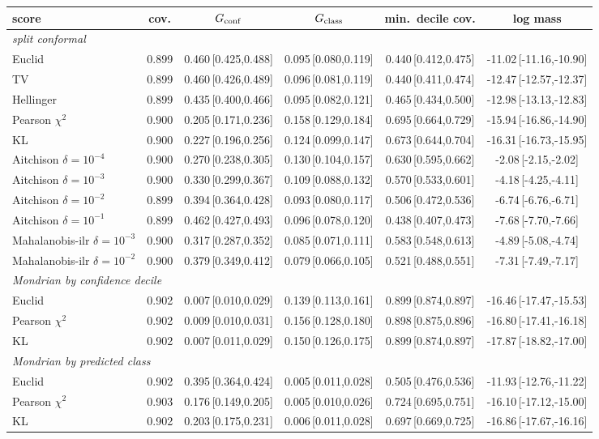 \begin{tabular}{lccccc}\toprule
score & cov. & $G_{\rm conf}$ & $G_{\rm class}$ & min.\ decile cov. & log mass\\\midrule
\multicolumn{6}{l}{\emph{split conformal}}\\
Euclid & 0.899 & 0.460\,[0.425,0.488] & 0.095\,[0.080,0.119] & 0.440\,[0.412,0.475] & -11.02\,[-11.16,-10.90]\\
TV & 0.899 & 0.460\,[0.426,0.489] & 0.096\,[0.081,0.119] & 0.440\,[0.411,0.474] & -12.47\,[-12.57,-12.37]\\
Hellinger & 0.899 & 0.435\,[0.400,0.466] & 0.095\,[0.082,0.121] & 0.465\,[0.434,0.500] & -12.98\,[-13.13,-12.83]\\
Pearson $\chi^2$ & 0.900 & 0.205\,[0.171,0.236] & 0.158\,[0.129,0.184] & 0.695\,[0.664,0.729] & -15.94\,[-16.86,-14.90]\\
KL & 0.900 & 0.227\,[0.196,0.256] & 0.124\,[0.099,0.147] & 0.673\,[0.644,0.704] & -16.31\,[-16.73,-15.95]\\
Aitchison $\delta{=}10^{-4}$ & 0.900 & 0.270\,[0.238,0.305] & 0.130\,[0.104,0.157] & 0.630\,[0.595,0.662] & -2.08\,[-2.15,-2.02]\\
Aitchison $\delta{=}10^{-3}$ & 0.900 & 0.330\,[0.299,0.367] & 0.109\,[0.088,0.132] & 0.570\,[0.533,0.601] & -4.18\,[-4.25,-4.11]\\
Aitchison $\delta{=}10^{-2}$ & 0.899 & 0.394\,[0.364,0.428] & 0.093\,[0.080,0.117] & 0.506\,[0.472,0.536] & -6.74\,[-6.76,-6.71]\\
Aitchison $\delta{=}10^{-1}$ & 0.899 & 0.462\,[0.427,0.493] & 0.096\,[0.078,0.120] & 0.438\,[0.407,0.473] & -7.68\,[-7.70,-7.66]\\
Mahalanobis-ilr $\delta{=}10^{-3}$ & 0.900 & 0.317\,[0.287,0.352] & 0.085\,[0.071,0.111] & 0.583\,[0.548,0.613] & -4.89\,[-5.08,-4.74]\\
Mahalanobis-ilr $\delta{=}10^{-2}$ & 0.900 & 0.379\,[0.349,0.412] & 0.079\,[0.066,0.105] & 0.521\,[0.488,0.551] & -7.31\,[-7.49,-7.17]\\
\multicolumn{6}{l}{\emph{Mondrian by confidence decile}}\\
Euclid & 0.902 & 0.007\,[0.010,0.029] & 0.139\,[0.113,0.161] & 0.899\,[0.874,0.897] & -16.46\,[-17.47,-15.53]\\
Pearson $\chi^2$ & 0.902 & 0.009\,[0.010,0.031] & 0.156\,[0.128,0.180] & 0.898\,[0.875,0.896] & -16.80\,[-17.41,-16.18]\\
KL & 0.902 & 0.007\,[0.011,0.029] & 0.150\,[0.126,0.175] & 0.899\,[0.874,0.897] & -17.87\,[-18.82,-17.00]\\
\multicolumn{6}{l}{\emph{Mondrian by predicted class}}\\
Euclid & 0.902 & 0.395\,[0.364,0.424] & 0.005\,[0.011,0.028] & 0.505\,[0.476,0.536] & -11.93\,[-12.76,-11.22]\\
Pearson $\chi^2$ & 0.903 & 0.176\,[0.149,0.205] & 0.005\,[0.010,0.026] & 0.724\,[0.695,0.751] & -16.10\,[-17.12,-15.00]\\
KL & 0.902 & 0.203\,[0.175,0.231] & 0.006\,[0.011,0.028] & 0.697\,[0.669,0.725] & -16.86\,[-17.67,-16.16]\\
\bottomrule\end{tabular}
